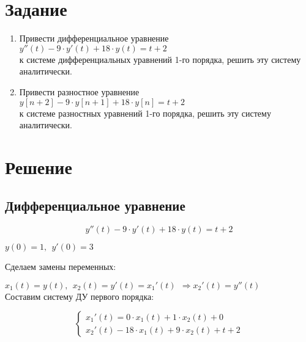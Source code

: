 




\section{Задание}

\begin{enumerate}

\item Привести дифференциальное уравнение\\ $y''(t) - 9 \cdot y'(t) + 18 \cdot y(t) = t + 2$\\ к системе дифференциальных уравнений 1-го порядка, решить эту систему аналитически.

\item Привести разностное уравнение\\ $y[n+2] - 9 \cdot y[n+1] + 18 \cdot y[n] = t + 2$\\ к системе разностных уравнений 1-го порядка, решить эту систему аналитически.

\end{enumerate}

\section{Решение}

\subsection{Дифференциальное уравнение}

\begin{displaymath}
y''(t) - 9 \cdot y'(t) + 18 \cdot y(t) = t + 2
\end{displaymath}
\begin{center}
$y(0) = 1,\ \ y'(0) = 3$
\end{center}

Сделаем замены переменных:

$x_1(t) = y(t),\ \ x_2(t) = y'(t) = x_1'(t) \ \ \Rightarrow x_2'(t) = y''(t)$\\[1mm]

Составим систему ДУ первого порядка:

\begin{displaymath}
\begin{cases}
x_1'(t) = 0 \cdot x_1(t) + 1 \cdot x_2(t) + 0
\\
x_2'(t) - 18 \cdot x_1(t) + 9 \cdot x_2(t) + t + 2
\end{cases}
\end{displaymath}

